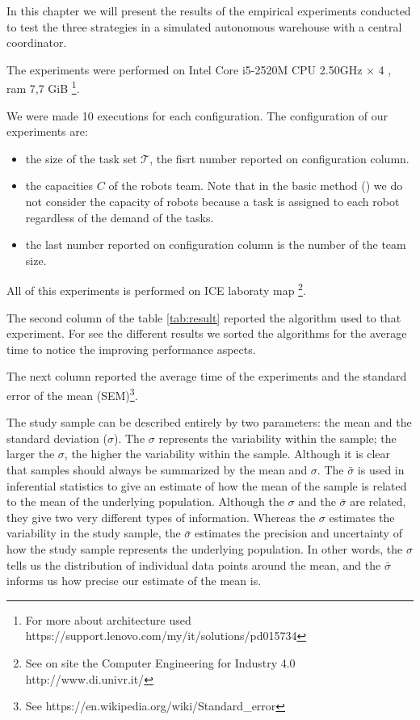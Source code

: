 In this chapter we will present the results of the empirical experiments conducted 
to test the three strategies in a simulated autonomous warehouse with a central 
coordinator.

The experiments were performed on Intel Core i5-2520M CPU 2.50GHz $\times$ 4
, ram 7,7 GiB \footnote{For more about architecture used https://support.lenovo.com/my/it/solutions/pd015734}.

We were made 10 executions for each configuration.
The configuration of our experiments are:
\begin{itemize}
    \item the size of the task set $\mathcal{T}$, the fisrt number reported on configuration column.
    \item the capacities $C$ of the robots team. Note that in the basic method (\srst) we do not consider the capacity of robots because a task is assigned to each robot regardless of the demand of the tasks.
    \item the last number reported on configuration column is the number of the team size.
\end{itemize}

All of this experiments is performed on ICE laboraty map \footnote{See on site the Computer Engineering for Industry 4.0 http://www.di.univr.it/}. 

The second column of the table \ref{tab:result} reported the algorithm used to that experiment.
For see the different results we sorted the algorithms for the average time to notice the improving performance aspects. 

The next column reported the average time of the experiments and the standard error of the mean (SEM)\footnote{See https://en.wikipedia.org/wiki/Standard\_error}. 

The study sample can be described entirely by two parameters: 
the mean and the standard deviation ($\sigma$). The $\sigma$ represents the variability within the sample;
the larger the $\sigma$, the higher the variability within the sample. 
Although it is clear that samples should always be summarized by the mean and $\sigma$. 
The $\bar{\sigma}$ is used in inferential statistics to give an estimate of how the mean of the sample is related to the mean of the underlying population.
Although the $\sigma$ and the $\bar{\sigma}$ are related, they give two very different types of information.
Whereas the $\sigma$ estimates the variability in the study sample, 
the $\bar{\sigma}$ estimates the precision and uncertainty of how the study sample represents the underlying population.
In other words, the $\sigma$ tells us the distribution of individual data points around the mean, and the $\bar{\sigma}$ informs us how precise our estimate of the mean is.


